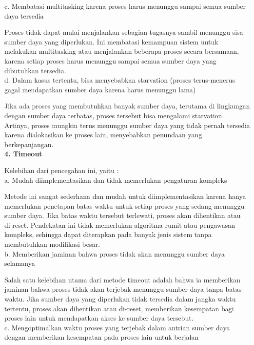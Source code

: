 \documentclass[12pt]{article}
\begin{document}
    c. Membatasi multitasking karena proses harus menunggu sampai semua sumber daya tersedia
    
    Proses tidak dapat mulai menjalankan sebagian tugasnya sambil menunggu sisa sumber daya yang diperlukan. Ini membatasi kemampuan sistem untuk melakukan multitasking atau menjalankan beberapa proses secara bersamaan, karena setiap proses harus menunggu sampai semua sumber daya yang dibutuhkan tersedia.\\

    d. Dalam kasus tertentu, bisa menyebabkan starvation (proses terus-menerus gagal mendapatkan sumber daya karena harus menunggu lama)
    
    Jika ada proses yang membutuhkan banyak sumber daya, terutama di lingkungan dengan sumber daya terbatas, proses tersebut bisa mengalami starvation. Artinya, proses mungkin terus menunggu sumber daya yang tidak pernah tersedia karena dialokasikan ke proses lain, menyebabkan penundaan yang berkepanjangan. \\

\textbf{4. Timeout\\}

    Kelebihan dari pencegahan ini, yaitu :\\

    a. Mudah diimplementasikan dan tidak memerlukan pengaturan kompleks
    
    Metode ini sangat sederhana dan mudah untuk diimplementasikan karena hanya memerlukan penetapan batas waktu untuk setiap proses yang sedang menunggu sumber daya. Jika batas waktu tersebut terlewati, proses akan dihentikan atau di-reset. Pendekatan ini tidak memerlukan algoritma rumit atau pengawasan kompleks, sehingga dapat diterapkan pada banyak jenis sistem tanpa membutuhkan modifikasi besar.\\

    b. Memberikan jaminan bahwa proses tidak akan menunggu sumber daya selamanya 
    
    Salah satu kelebihan utama dari metode timeout adalah bahwa ia memberikan jaminan bahwa proses tidak akan terjebak menunggu sumber daya tanpa batas waktu. Jika sumber daya yang diperlukan tidak tersedia dalam jangka waktu tertentu, proses akan dihentikan atau di-reset, memberikan kesempatan bagi proses lain untuk mendapatkan akses ke sumber daya tersebut.\\

    c. Mengoptimalkan waktu proses yang terjebak dalam antrian sumber daya dengan memberikan kesempatan pada proses lain untuk berjalan
    
\end{document}
